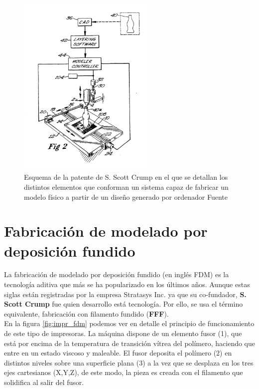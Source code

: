 \begin{figure}[H]
    \centering
    \includegraphics[width=0.6\textwidth]{images/estado.arte/US5340433-2.png}
    \caption[Esquema de la patente de S. Scott Crump.]{Esquema de la patente de S. Scott Crump en el que se detallan los distintos elementos que conforman un sistema capaz de fabricar un modelo físico a partir de un diseño generado por ordenador Fuente  \cite{crump1992apparatus}}
    \label{fig:impr_patente_sistema}
\end{figure}


\section{Fabricación de modelado por deposición fundido}
\label{sec:FDM}
La fabricación de modelado por deposición fundido (en inglés FDM\textregistered ) es la tecnología aditiva que más se ha popularizado en los últimos años. Aunque estas siglas están registradas por la empresa Stratasys Inc. ya que su co-fundador,  \textbf{S. Scott Crump} fue quien desarrollo está tecnología. Por ello, se usa el término equivalente, fabricación con filamento fundido (\textbf{FFF}).\\  

En la figura \ref{fig:impr_fdm} podemos ver en detalle el principio de funcionamiento de este tipo de impresoras. La máquina dispone de un elemento fusor (1), que está por encima de la temperatura de transición vítrea del polímero, haciendo que entre en un estado viscoso y maleable. El fusor deposita el polímero (2) en distintos niveles sobre una superficie plana (3) a la vez que se desplaza en los tres ejes cartesianos (X,Y,Z), de este modo, la pieza es creada con el filamento que solidifica al salir del fusor.\\

